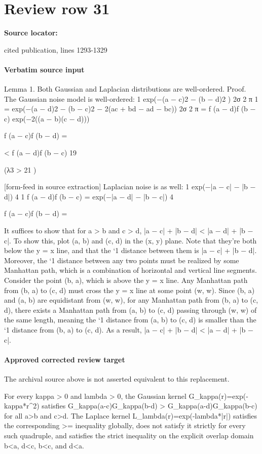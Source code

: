 \documentclass[10pt]{article}
\begin{document}
\section*{Review row 31}
\textbf{Source locator:} {\footnotesize\raggedright cited publication, lines 1293-\allowbreak{}1329\par}
\paragraph{Verbatim source input}
\begin{ReviewVerbatim}
Lemma 1. Both Gaussian and Laplacian distributions are well-ordered.
Proof. The Gaussian noise model is well-ordered:
1
exp(−(a − c)2 − (b − d)2 )
2σ 2 π
1
=
exp(−(a − d)2 − (b − c)2 − 2(ac + bd − ad − bc))
2σ 2 π
= f (a − d)f (b − c) exp(−2((a − b)(c − d)))

f (a − c)f (b − d) =

< f (a − d)f (b − c)
19

(λ3 > 21 )


[form-feed in source extraction]
Laplacian noise is as well:
1
exp(−|a − c| − |b − d|)
4
1
f (a − d)f (b − c) = exp(−|a − d| − |b − c|)
4

f (a − c)f (b − d) =

It suffices to show that for a > b and c > d, |a − c| + |b − d| < |a − d| + |b − c|. To show this, plot
(a, b) and (c, d) in the (x, y) plane. Note that they’re both below the y = x line, and that the `1 distance
between them is |a − c| + |b − d|. Moreover, the `1 distance between any two points must be realized by
some Manhattan path, which is a combination of horizontal and vertical line segments. Consider the point
(b, a), which is above the y = x line. Any Manhattan path from (b, a) to (c, d) must cross the y = x line at
some point (w, w). Since (b, a) and (a, b) are equidistant from (w, w), for any Manhattan path from (b, a)
to (c, d), there exists a Manhattan path from (a, b) to (c, d) passing through (w, w) of the same length,
meaning the `1 distance from (a, b) to (c, d) is smaller than the `1 distance from (b, a) to (c, d). As a result,
|a − c| + |b − d| < |a − d| + |b − c|.
\end{ReviewVerbatim}

\paragraph{Approved corrected review target}
The archival source above is not asserted equivalent to this replacement.
\begin{ReviewVerbatim}
For every kappa > 0 and lambda > 0, the Gaussian kernel G_kappa(r)=exp(-kappa*r^2) satisfies G_kappa(a-c)G_kappa(b-d) > G_kappa(a-d)G_kappa(b-c) for all a>b and c>d. The Laplace kernel L_lambda(r)=exp(-lambda*|r|) satisfies the corresponding >= inequality globally, does not satisfy it strictly for every such quadruple, and satisfies the strict inequality on the explicit overlap domain b<a, d<c, b<c, and d<a.
\end{ReviewVerbatim}
\end{document}
